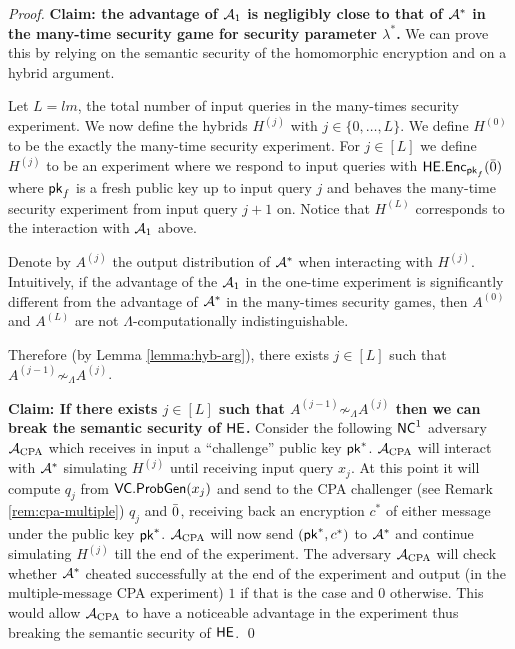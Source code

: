 \begin{proof}
\textbf{Claim: the advantage of $\mathcal{A}_1$ is negligibly close to that of $\mathcal{A}^*$ in the many-time security game for security parameter $\lambda^*$.}
We can  prove this by relying on the semantic security of the homomorphic encryption and on a hybrid argument.

Let $L = lm$, the total number of input queries in the many-times security experiment. We now define the hybrids $H^{(j)}$ with $j \in \{0, \dots, L\}$. We define $H^{(0)}$ to be the exactly the many-time security experiment. 
For $j \in [L]$ we define $H^{(j)}$ to be an experiment where we respond to input queries with $\mathsf{HE.Enc}_{\mathsf{pk}_f}(\bar{0})$  where $\mathsf{pk}_f$ is a fresh public key up to input query $j$ and behaves the many-time security experiment from input query $j+1$ on. Notice that $H^{(L)}$ corresponds to the interaction with $\mathcal{A}_1$ above.

Denote by $A^{(j)}$ the output distribution of $\mathcal{A}^*$ when interacting with $H^{(j)}$.
Intuitively, if the advantage of the $\mathcal{A}_1$ in the one-time experiment is significantly different from the advantage of $\mathcal{A}^*$ in the many-times security games, then $A^{(0)}$ and $A^{(L)}$ are not $\Lambda$-computationally indistinguishable.

Therefore (by Lemma \ref{lemma:hyb-arg}), there exists $j \in [L]$ such that $A^{(j-1)} \not \sim_{\Lambda} A^{(j)}$.

\def\advcpa{\adv_{\text{CPA}}}
\textbf{Claim: If there exists $j \in [L]$ such that $A^{(j-1)} \not \sim_{\Lambda} A^{(j)}$ then we can break the semantic security of $\mathsf{HE}$.
}
Consider the following ${\mathsf{NC}}^1$ adversary $\advcpa$ which receives in input a ``challenge'' public key $\mathsf{pk}^*$. $\advcpa$ will interact with $\mathcal{A}^*$ simulating $H^{(j)}$ until receiving input query $x_{j}$.
At this point it will compute $q_j$ from $\mathsf{VC.ProbGen}(x_j)$ and send to the CPA challenger (see Remark \ref{rem:cpa-multiple}) $q_j$ and $\bar{0}$, receiving back an encryption $c^*$ of either message under the public key $\mathsf{pk}^*$. $\advcpa$ will now send $(\mathsf{pk}^*, c^*)$ to $\mathcal{A}^*$ and continue simulating $H^{(j)}$ till the end of the experiment.
The adversary $\advcpa$ will check whether $\mathcal{A}^*$ cheated successfully at the end of the experiment and output (in the multiple-message CPA experiment) $1$ if that is the case and $0$ otherwise. This would allow $\advcpa$ to have a noticeable advantage in the experiment thus breaking the semantic security of $\mathsf{HE}$. \qed
\end{proof}


